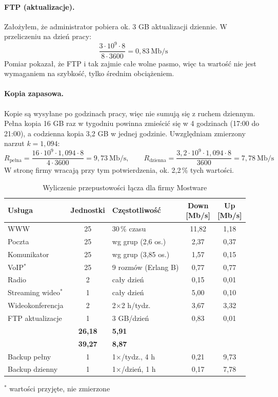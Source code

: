\documentclass[12pt,a4paper]{article}
\begin{document}
\paragraph{FTP (aktualizacje).} Założyłem, że administrator pobiera ok. 3 GB aktualizacji dziennie.
W przeliczeniu na dzień pracy:
\[
\frac{3 \cdot 10^9 \cdot 8}{8 \cdot 3600} = 0{,}83\ \text{Mb/s}
\]
Pomiar pokazał, że FTP i tak zajmie całe wolne pasmo, więc ta wartość nie jest wymaganiem
na szybkość, tylko średnim obciążeniem.

\paragraph{Kopia zapasowa.} Kopie są wysyłane po godzinach pracy, więc nie sumują się z ruchem
dziennym. Pełna kopia 16 GB raz w tygodniu powinna zmieścić się w 4 godzinach (17:00 do 21:00),
a codzienna kopia 3,2 GB w jednej godzinie. Uwzględniam zmierzony narzut $k = 1{,}094$:
\[
R_{\text{pełna}} = \frac{16 \cdot 10^9 \cdot 1{,}094 \cdot 8}{4 \cdot 3600} = 9{,}73\ \text{Mb/s}, \qquad
R_{\text{dzienna}} = \frac{3{,}2 \cdot 10^9 \cdot 1{,}094 \cdot 8}{3600} = 7{,}78\ \text{Mb/s}
\]
W stronę firmy wracają przy tym potwierdzenia, ok. 2,2\,\% tych wartości.

\begin{table}[H]\centering
\begin{tabular}{>{\raggedright}p{3.4cm}c>{\raggedright}p{3.0cm}cc}
\toprule
Usługa & Jednostki & Częstotliwość & \shortstack{Down\\{}[Mb/s]} & \shortstack{Up\\{}[Mb/s]} \\
\midrule
WWW & 25 & 30\,\% czasu & 11,82 & 1,18 \\
Poczta & 25 & wg grup (2,6 os.) & 2,37 & 0,37 \\
Komunikator & 25 & wg grup (3,85 os.) & 1,57 & 0,15 \\
VoIP$^{*}$ & 25 & 9 rozmów (Erlang B) & 0,77 & 0,77 \\
Radio & 2 & cały dzień & 0,15 & 0,01 \\
Streaming wideo$^{*}$ & 1 & cały dzień & 5,00 & 0,10 \\
Wideokonferencja & 2 & 2$\times$2 h/tydz. & 3,67 & 3,32 \\
FTP aktualizacje & 1 & 3 GB/dzień & 0,83 & 0,01 \\
\midrule
\multicolumn{3}{r}{\textbf{Suma w godzinach pracy}} & \textbf{26,18} & \textbf{5,91} \\
\multicolumn{3}{r}{\textbf{Z zapasem 50\,\%}} & \textbf{39,27} & \textbf{8,87} \\
\midrule
Backup pełny & 1 & 1$\times$/tydz., 4 h & 0,21 & 9,73 \\
Backup dzienny & 1 & 1$\times$/dzień, 1 h & 0,17 & 7,78 \\
\bottomrule
\end{tabular}

\vspace{0.2em}
{\small $^{*}$ wartości przyjęte, nie zmierzone}
\caption{Wyliczenie przepustowości łącza dla firmy Mostware}
\end{table}
\end{document}
